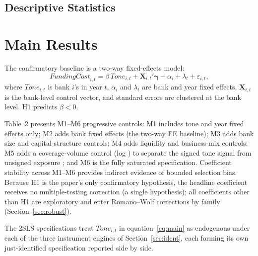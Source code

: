 \subsection{Descriptive Statistics}

\section{Main Results}\label{sec:main}

The confirmatory baseline is a two-way fixed-effects model:
\begin{equation}\label{eq:main}
\mathit{FundingCost}_{i,t}
  = \beta\, \mathit{Tone}_{i,t}
  + \mathbf{X}_{i,t}'\boldsymbol{\gamma}
  + \alpha_i + \lambda_t + \varepsilon_{i,t},
\end{equation}
where $\mathit{Tone}_{i,t}$ is bank $i$'s
 in year $t$, $\alpha_i$ and $\lambda_t$
are bank and year fixed effects, $\mathbf{X}_{i,t}$ is the bank-level
control vector, and standard errors are clustered at the bank level.
H1 predicts $\beta < 0$.

Table~2 presents M1--M6 progressive controls: M1 includes tone and
year fixed effects only; M2 adds bank fixed effects (the two-way FE
baseline); M3 adds bank size and capital-structure controls; M4 adds
liquidity and business-mix controls; M5 adds a coverage-volume control
(log ) to separate the signed tone signal from
unsigned exposure \parencite{cookson2024socialsignal}; and M6 is the
fully saturated specification. Coefficient stability across M1--M6
provides indirect evidence of bounded selection bias. Because H1 is
the paper's only confirmatory hypothesis, the headline coefficient
receives no multiple-testing correction (a single hypothesis); all
coefficients other than H1 are exploratory and enter Romano--Wolf
corrections by family (Section~\ref{sec:robust}).

The 2SLS specifications treat $\mathit{Tone}_{i,t}$ in
equation~\eqref{eq:main} as endogenous under each of the three
instrument engines of Section~\ref{sec:ident}, each forming its own
just-identified specification reported side by side.

